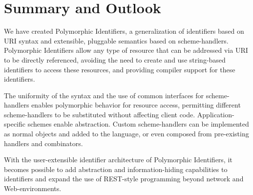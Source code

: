 \documentclass{acm_proc_article-sp}
\begin{document}

\section{Summary and Outlook}
\label{summary-and-outlook}

We have created Polymorphic Identifiers, a generalization of identifiers based on URI
syntax and extensible, pluggable semantics based on scheme-handlers.   
Polymorphic Identifiers allow any type of resource that can be addressed via URI
to be directly referenced, avoiding the need to create and use string-based identifiers 
to access these resources, and providing compiler support for these identifiers.

The uniformity of the syntax and the use of common interfaces for scheme-handlers
enables polymorphic behavior for resource access, permitting different scheme-handlers
to be substituted without affecting client code. Application-specific schemes
enable abstraction.
Custom scheme-handlers can be implemented as normal objects and added
to the language, or even composed from pre-existing handlers and
combinators.

With the user-extensible identifier architecture of Polymorphic Identifiers, it becomes possible to add abstraction
and information-hiding capabilities to identifiers and expand the use of REST-style
programming beyond network and Web-environments.











\vfill
\break






\end{document}
